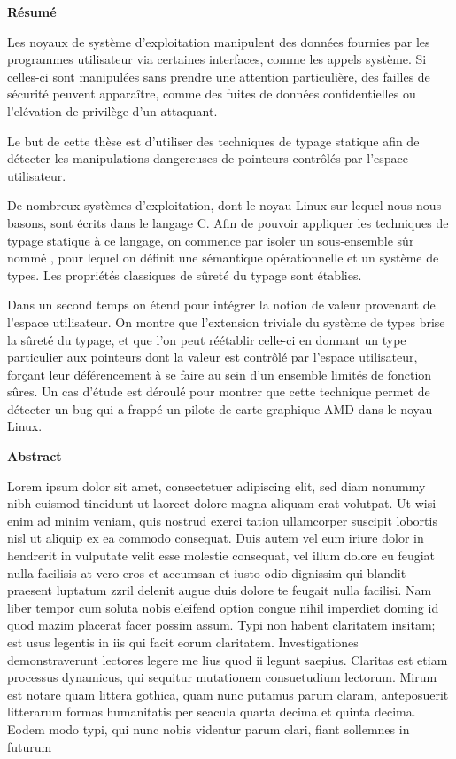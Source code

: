 \begin{headingpage}
\thispagestyle{empty}

\begin{center}\Large \textbf{Résumé}\end{center}

Les noyaux de système d'exploitation manipulent des données fournies par
les programmes utilisateur via certaines interfaces, comme les appels système.
Si celles-ci sont manipulées sans prendre une attention particulière, des
failles de sécurité peuvent apparaître, comme des fuites de données
confidentielles ou l'elévation de privilège d'un attaquant.

Le but de cette thèse est d'utiliser des techniques de typage statique afin de
détecter les manipulations dangereuses de pointeurs contrôlés par l'espace
utilisateur.

De nombreux systèmes d'exploitation, dont le noyau Linux sur lequel nous nous
basons, sont écrits dans le langage C. Afin de pouvoir appliquer les techniques
de typage statique à ce langage, on commence par isoler un sous-ensemble sûr
nommé \langname, pour lequel on définit une sémantique opérationnelle et un
système de types. Les propriétés classiques de sûreté du typage sont établies.

Dans un second temps on étend \langname pour intégrer la notion de valeur
provenant de l'espace utilisateur. On montre que l'extension triviale du système
de types brise la sûreté du typage, et que l'on peut réétablir celle-ci en
donnant un type particulier aux pointeurs dont la valeur est contrôlé par
l'espace utilisateur, forçant leur déférencement à se faire au sein d'un
ensemble limités de fonction sûres. Un cas d'étude est déroulé pour montrer que
cette technique permet de détecter un bug qui a frappé un pilote de carte
graphique AMD dans le noyau Linux.

\begin{center}\Large \textbf{Abstract}\end{center}

Lorem ipsum dolor sit amet, consectetuer adipiscing elit, sed diam nonummy nibh
euismod tincidunt ut laoreet dolore magna aliquam erat volutpat. Ut wisi enim ad
minim veniam, quis nostrud exerci tation ullamcorper suscipit lobortis nisl ut
aliquip ex ea commodo consequat. Duis autem vel eum iriure dolor in hendrerit in
vulputate velit esse molestie consequat, vel illum dolore eu feugiat nulla
facilisis at vero eros et accumsan et iusto odio dignissim qui blandit praesent
luptatum zzril delenit augue duis dolore te feugait nulla facilisi. Nam liber
tempor cum soluta nobis eleifend option congue nihil imperdiet doming id quod
mazim placerat facer possim assum. Typi non habent claritatem insitam; est usus
legentis in iis qui facit eorum claritatem. Investigationes demonstraverunt
lectores legere me lius quod ii legunt saepius. Claritas est etiam processus
dynamicus, qui sequitur mutationem consuetudium lectorum. Mirum est notare quam
littera gothica, quam nunc putamus parum claram, anteposuerit litterarum formas
humanitatis per seacula quarta decima et quinta decima. Eodem modo typi, qui
nunc nobis videntur parum clari, fiant sollemnes in futurum


\end{headingpage}
